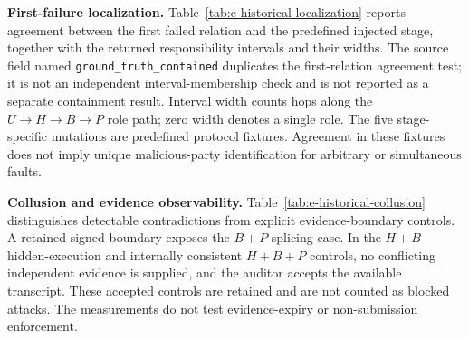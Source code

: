

\noindent\textbf{First-failure localization.}
Table~\ref{tab:e-historical-localization} reports agreement between the first
failed relation and the predefined injected stage, together with the returned
responsibility intervals and their widths. The source field named
\texttt{ground\_truth\_contained} duplicates the first-relation agreement test;
it is not an independent interval-membership check and is not reported as a
separate containment result.
Interval width counts hops along the $U\!\rightarrow\!H\!\rightarrow\!B\!\rightarrow\!P$
role path; zero width denotes a single role. The five stage-specific mutations
are predefined protocol fixtures. Agreement in these fixtures does not imply
unique malicious-party identification for arbitrary or simultaneous faults.



\noindent\textbf{Collusion and evidence observability.}
Table~\ref{tab:e-historical-collusion} distinguishes detectable contradictions
from explicit evidence-boundary controls. A retained signed boundary exposes
the $B+P$ splicing case. In the $H+B$ hidden-execution and internally consistent
$H+B+P$ controls, no conflicting independent evidence is supplied, and the
auditor accepts the available transcript. These accepted controls are retained
and are not counted as blocked attacks. The measurements do not test
evidence-expiry or non-submission enforcement.


